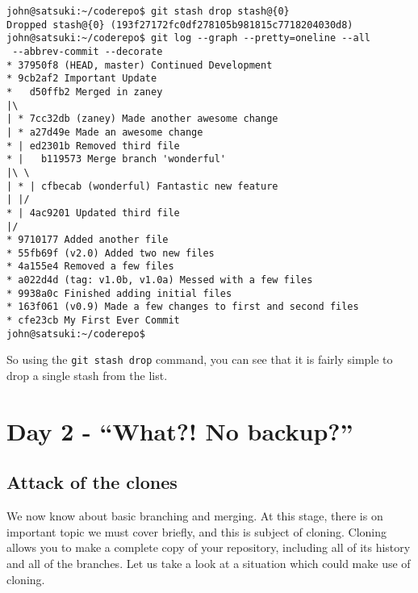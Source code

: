 \begin{Verbatim}[frame=leftline,framerule=1mm,fontsize=\relsize{-3}] 
john@satsuki:~/coderepo$ git stash drop stash@{0}
Dropped stash@{0} (193f27172fc0df278105b981815c7718204030d8)
john@satsuki:~/coderepo$ git log --graph --pretty=oneline --all 
 --abbrev-commit --decorate
* 37950f8 (HEAD, master) Continued Development
* 9cb2af2 Important Update
*   d50ffb2 Merged in zaney
|\  
| * 7cc32db (zaney) Made another awesome change
| * a27d49e Made an awesome change
* | ed2301b Removed third file
* |   b119573 Merge branch 'wonderful'
|\ \  
| * | cfbecab (wonderful) Fantastic new feature
| |/  
* | 4ac9201 Updated third file
|/  
* 9710177 Added another file
* 55fb69f (v2.0) Added two new files
* 4a155e4 Removed a few files
* a022d4d (tag: v1.0b, v1.0a) Messed with a few files
* 9938a0c Finished adding initial files
* 163f061 (v0.9) Made a few changes to first and second files
* cfe23cb My First Ever Commit
john@satsuki:~/coderepo$ 
\end{Verbatim}

So using the \texttt{git stash drop} command, you can see that it is fairly simple to drop a single stash from the list.


\section{Day 2 - ``What?! No backup?''}
\subsection{Attack of the clones}

We now know about basic branching and merging.  At this stage, there is on important topic we must cover briefly, and this is subject of cloning.  Cloning allows you to make a complete copy of your repository, including all of its history and all of the branches.  Let us take a look at a situation which could make use of cloning.

